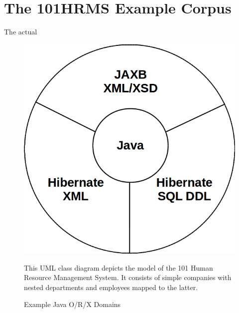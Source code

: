 \section{The 101HRMS Example Corpus}
The actual 

\begin{figure}[h!]
\begin{center}
\includegraphics[scale=.5]{images/JORXDomains.png}
\end{center}
{
\scriptsize 
This UML class diagram depicts the model of the 101 Human Resource Management System.
It consists of simple companies with nested departments and employees mapped to the latter.
}
\caption{Example Java O/R/X Domains}
\label{figure:ExampleJORXDomains}
\end{figure}

%
